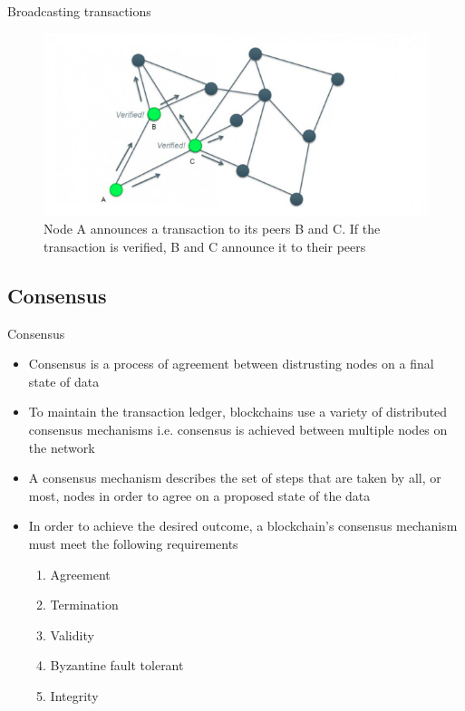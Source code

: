 \documentclass[11pt]{beamer}
\begin{document}
\begin{frame}{Broadcasting transactions}
	\begin{figure}[]
		\centering
		\includegraphics  [scale=0.4]{Images/broadcast}
		\caption{Node A announces a transaction to its peers B and C. If the transaction is verified, B and C announce it to their peers}
	\end{figure}
\end{frame}



\subsection{Consensus}

\begin{frame}{Consensus}
	\begin{itemize}
		\item Consensus is a process of agreement between distrusting nodes on a final state of data
		\item To maintain the transaction ledger, blockchains use a variety of distributed consensus mechanisms i.e. consensus is achieved between multiple nodes on the network
		\item A consensus mechanism describes the set of steps that are taken by all, or most, nodes in order to agree on a proposed state of the data
		\item In order to achieve the desired outcome, a blockchain's consensus mechanism must meet the following requirements
		\begin{enumerate}
			\item Agreement
			\item Termination
			\item Validity
			\item Byzantine fault tolerant
			\item Integrity
		\end{enumerate}
	\end{itemize}
\end{frame}
\end{document}
